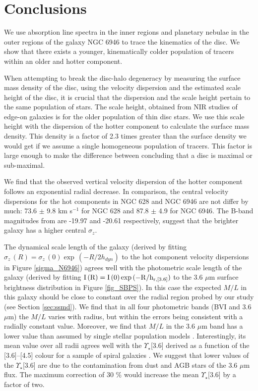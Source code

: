 \documentclass[fleqn,usenatbib]{mnras}
\begin{document}
\section{Conclusions} %
We use absorption line spectra in the inner regions and planetary nebulae in the outer regions of the galaxy NGC 6946 to trace the kinematics of the disc. We show that there exists a younger, kinematically colder population of tracers 
within an older and hotter component.

When attempting to break the disc-halo degeneracy by measuring the surface mass density of the disc, using the velocity dispersion and the estimated scale height of the disc, it is crucial that the dispersion and the scale height %
pertain to the same population of stars. The scale height, obtained from NIR studies of edge-on galaxies %
is for the older population of thin disc stars. We use this scale height with the dispersion of the hotter component to calculate the surface mass density. This density is a factor of 2.3 times greater than the surface density we would get if we assume a single homogeneous population of tracers. This factor is large enough to make the difference between concluding that a disc is maximal or sub-maximal. 

We find that the observed vertical velocity dispersion of the hotter component follows an exponential radial decrease. In comparison, the central velocity dispersions for the hot components in NGC 628 and NGC 6946 are not differ by much: 73.6 $\pm$ 9.8 km s$^{-1}$ for NGC 628 and 87.8 $\pm$ 4.9 for NGC 6946. The B-band magnitudes from \citet{things} are -19.97 and -20.61 respectively, suggest that the brighter galaxy has a higher central $\sigma_z$.

 The dynamical scale length of the galaxy (derived by fitting $\sigma_z\,(R) = \sigma_z\,(0)  \exp \,(-R/2h_{dyn})$ to the hot component velocity 
dispersions in Figure \ref{sigma_N6946}) agrees well with the photometric scale length of the galaxy (derived by fitting $\rm I\,(R) =  I\,(0) \exp \,(-R/h_{r,[3.6]})$  to the 3.6 $\mu$m surface brightness distribution in Figure \ref{fig_SBPS}). In this case the expected $M/L$ in this galaxy should be close to constant over the radial region probed by our study (see Section \ref{sec:ssmd}). We find that in all four photometric bands (BVI and 3.6 $\mu$m) the $M/L$ varies with radius, but within the errors being consistent with a radially constant value. Moreover, we find that $M/L$  in the 3.6 $\mu$m band  has a lower value than assumed by single stellar population models \citep{meidt12, miguel15,rock15}. Interestingly, its mean value over all radii agrees well with the $\Upsilon_{\star}$[3.6] derived as a function of the [3.6]--[4.5] colour  for a sample of spiral galaxies \citep{ponomareva18}. We suggest that lower values of the $\Upsilon_{\star}$[3.6] are due to the contamination from dust and AGB stars of the 3.6 $\mu$m flux. The maximum correction of 30 \% \citep{miguel15} would increase the mean $\Upsilon_{\star}$[3.6] by a factor of two. 
\end{document}
